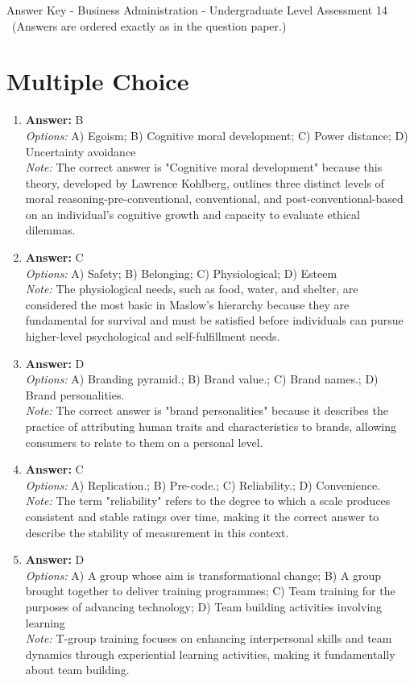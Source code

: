 \documentclass[12pt]{article}
\begin{document}
\begin{center}
Answer Key - Business Administration - Undergraduate Level Assessment 14 \
\small (Answers are ordered exactly as in the question paper.)
\end{center}

\section*{Multiple Choice}
\begin{enumerate}[label=\arabic*.]
\item \textbf{Answer:} B
\\ \textit{Options:} A) Egoism; B) Cognitive moral development; C) Power distance; D) Uncertainty avoidance
\\ \textit{Note:} The correct answer is "Cognitive moral development" because this theory, developed by Lawrence Kohlberg, outlines three distinct levels of moral reasoning-pre-conventional, conventional, and post-conventional-based on an individual's cognitive growth and capacity to evaluate ethical dilemmas.
\item \textbf{Answer:} C
\\ \textit{Options:} A) Safety; B) Belonging; C) Physiological; D) Esteem
\\ \textit{Note:} The physiological needs, such as food, water, and shelter, are considered the most basic in Maslow's hierarchy because they are fundamental for survival and must be satisfied before individuals can pursue higher-level psychological and self-fulfillment needs.
\item \textbf{Answer:} D
\\ \textit{Options:} A) Branding pyramid.; B) Brand value.; C) Brand names.; D) Brand personalities.
\\ \textit{Note:} The correct answer is "brand personalities" because it describes the practice of attributing human traits and characteristics to brands, allowing consumers to relate to them on a personal level.
\item \textbf{Answer:} C
\\ \textit{Options:} A) Replication.; B) Pre-code.; C) Reliability.; D) Convenience.
\\ \textit{Note:} The term "reliability" refers to the degree to which a scale produces consistent and stable ratings over time, making it the correct answer to describe the stability of measurement in this context.
\item \textbf{Answer:} D
\\ \textit{Options:} A) A group whose aim is transformational change; B) A group brought together to deliver training programmes; C) Team training for the purposes of advancing technology; D) Team building activities involving learning
\\ \textit{Note:} T-group training focuses on enhancing interpersonal skills and team dynamics through experiential learning activities, making it fundamentally about team building.
\end{enumerate}
\end{document}
